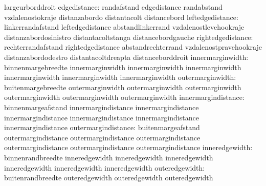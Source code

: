                                   largeurborddroit
                    edgedistance: randafstand                      edgedistance
                                  randabstand                      vzdalenostokraje
                                  distanzabordo                    distantacolt
                                  distancebord
                leftedgedistance: linkerrandafstand                leftedgedistance
                                  abstandlinkerrand                vzdalenostlevehookraje
                                  distanzabordosinistro            distantacoltstanga
                                  distancebordgauche
               rightedgedistance: rechterrandafstand               rightedgedistance
                                  abstandrechterrand               vzdalenostpravehookraje
                                  distanzabordodestro              distantacoltdreapta
                                  distanceborddroit
              innermarginwidth:   binnenmargebreedte               innermarginwidth
                                  innermarginwidth                 innermarginwidth
                                  innermarginwidth                 innermarginwidth
                                  innermarginwidth
              outermarginwidth:   buitenmargebreedte               outermarginwidth
                                  outermarginwidth                 outermarginwidth
                                  outermarginwidth                 outermarginwidth
                                  outermarginwidth
             innermargindistance: binnenmargeafstand               innermargindistance
                                  innermargindistance              innermargindistance
                                  innermargindistance              innermargindistance
                                  innermargindistance
             outermargindistance: buitenmargeafstand               outermargindistance
                                  outermargindistance              outermargindistance
                                  outermargindistance              outermargindistance
                                  outermargindistance
                inneredgewidth:   binnenrandbreedte                inneredgewidth
                                  inneredgewidth                   inneredgewidth
                                  inneredgewidth                   inneredgewidth
                                  inneredgewidth
                outeredgewidth:   buitenrandbreedte                outeredgewidth
                                  outeredgewidth                   outeredgewidth
